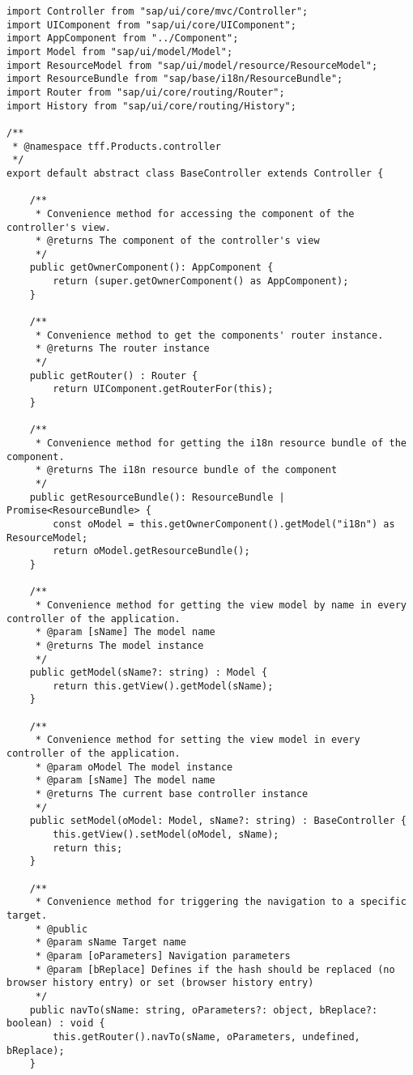 \begin{mdframed}[backgroundcolor=mygrey2, leftmargin=0.5cm, hidealllines=true, innerleftmargin=3pt, innerrightmargin=0cm, innertopmargin=0cm, innerbottommargin=-3cm, splitbottomskip=0]
\begin{lstlisting}[emph={event, UI5Event, listItem, detail, path}, caption=Base Controller der Anwendung]
import Controller from "sap/ui/core/mvc/Controller";
import UIComponent from "sap/ui/core/UIComponent";
import AppComponent from "../Component";
import Model from "sap/ui/model/Model";
import ResourceModel from "sap/ui/model/resource/ResourceModel";
import ResourceBundle from "sap/base/i18n/ResourceBundle";
import Router from "sap/ui/core/routing/Router";
import History from "sap/ui/core/routing/History";

/**
 * @namespace tff.Products.controller
 */
export default abstract class BaseController extends Controller {

	/**
	 * Convenience method for accessing the component of the controller's view.
	 * @returns The component of the controller's view
	 */
	public getOwnerComponent(): AppComponent {
		return (super.getOwnerComponent() as AppComponent);
	}

	/**
	 * Convenience method to get the components' router instance.
	 * @returns The router instance
	 */
	public getRouter() : Router {
		return UIComponent.getRouterFor(this);
	}

	/**
	 * Convenience method for getting the i18n resource bundle of the component.
	 * @returns The i18n resource bundle of the component
	 */
	public getResourceBundle(): ResourceBundle | Promise<ResourceBundle> {
		const oModel = this.getOwnerComponent().getModel("i18n") as ResourceModel;
		return oModel.getResourceBundle();
	}

	/**
	 * Convenience method for getting the view model by name in every controller of the application.
	 * @param [sName] The model name
	 * @returns The model instance
	 */
	public getModel(sName?: string) : Model {
		return this.getView().getModel(sName);
	}

	/**
	 * Convenience method for setting the view model in every controller of the application.
	 * @param oModel The model instance
	 * @param [sName] The model name
	 * @returns The current base controller instance
	 */
	public setModel(oModel: Model, sName?: string) : BaseController {
		this.getView().setModel(oModel, sName);
		return this;
	}

	/**
	 * Convenience method for triggering the navigation to a specific target.
	 * @public
	 * @param sName Target name
	 * @param [oParameters] Navigation parameters
	 * @param [bReplace] Defines if the hash should be replaced (no browser history entry) or set (browser history entry)
	 */
	public navTo(sName: string, oParameters?: object, bReplace?: boolean) : void {
		this.getRouter().navTo(sName, oParameters, undefined, bReplace);
	}


\end{lstlisting}
\end{mdframed}

